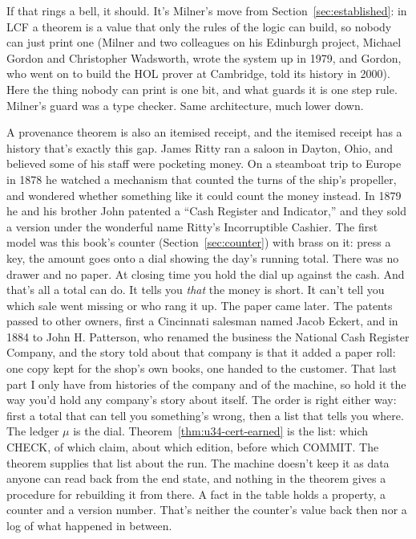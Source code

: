 \documentclass[11pt,twoside]{article}
\theoremstyle{thielethm}
\theoremstyle{thieledef}
\theoremstyle{thieledef}
\theoremstyle{thieledef}
\theoremstyle{thielethm}
\theoremstyle{thieleobs}
\theoremstyle{thielethm}
\begin{document}
If that rings a bell, it should. It's Milner's move from Section~\ref{sec:established}: in LCF a theorem is
a value that only the rules of the logic can build, so nobody can just print one (Milner and two
colleagues on his Edinburgh project, Michael Gordon and Christopher Wadsworth, wrote the system up
in 1979, and Gordon, who went on to build the HOL prover at Cambridge, told its history in
2000). Here the thing nobody can print is one bit, and what guards it is one step rule. Milner's guard
was a type checker. Same architecture, much lower down.

A provenance theorem is also an itemised receipt, and the itemised receipt has a history that's
exactly this gap. James Ritty ran a saloon in Dayton, Ohio, and believed some of his staff were
pocketing money. On a steamboat trip to Europe in 1878 he watched a mechanism that counted the
turns of the ship's propeller, and wondered whether something like it could count the money
instead. In 1879 he and his brother John patented a ``Cash Register and Indicator,'' and they
sold a version under the wonderful name Ritty's Incorruptible Cashier. The first model was this
book's counter (Section~\ref{sec:counter}) with brass on it: press a key, the amount goes onto a
dial showing the day's running total. There was no drawer and no paper. At closing time you hold the dial up
against the cash. And that's all a total can do. It tells you \emph{that} the money is short. It can't
tell you which sale went missing or who rang it up. The paper came later. The patents passed to
other owners, first a Cincinnati salesman named Jacob Eckert, and in 1884 to John H. Patterson,
who renamed the business the National Cash Register Company, and the story told
about that company is that it added a paper roll: one copy kept for the shop's own books, one
handed to the customer. That last part I only have from histories of the company and of the
machine, so hold it the way you'd hold any company's story about itself. The order is right
either way: first a total that can tell you something's wrong, then a list that tells you where.
The ledger $\mu$ is the dial. Theorem~\ref{thm:u34-cert-earned} is the list: which CHECK, of
which claim, about which edition, before which COMMIT. The theorem supplies that list about the
run. The machine doesn't keep it as data anyone can read back from the end state, and nothing
in the theorem gives a procedure for rebuilding it from there. A fact in the table holds a
property, a counter and a version number. That's neither the counter's value back then nor a
log of what happened in between.
\end{document}
